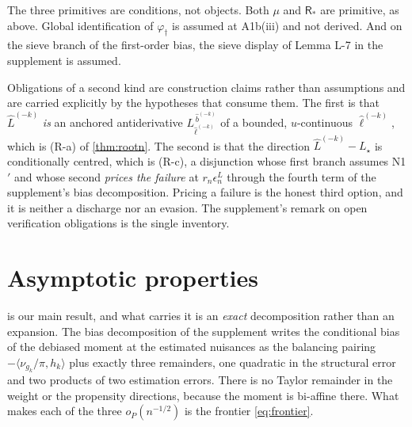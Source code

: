 \documentclass[
  12pt]{article}
\newcommand{\1}[1]{\mathds{1}\left[#1\right]}
\theoremstyle{plain}
\theoremstyle{definition}
\theoremstyle{definition}
\theoremstyle{remark}
\newcommand{\vdagger}{\varphi_{\dagger}}
\begin{document}
The three primitives are conditions, not objects. Both \(\mu\) and
\(\mathsf R_\ast\) are primitive, as above. Global identification of
\(\vdagger\) is assumed at A1b(iii) and not derived. And on the sieve
branch of the first-order bias, the sieve display of Lemma L-7 in the
supplement is assumed.

Obligations of a second kind are construction claims rather than
assumptions and are carried explicitly by the hypotheses that consume
them. The first is that \(\hat L^{(-k)}\) \emph{is} an anchored
antiderivative \(L^{\,\hat b^{(-k)}}_{\hat\ell^{(-k)}}\) of a bounded,
\(u\)-continuous \(\hat\ell^{(-k)}\), which is (R-a) of
\cref{thm:rootn}. The second is that the direction
\(\hat L^{(-k)}-L_\star\) is conditionally centred, which is (R-c), a
disjunction whose first branch assumes N1\('\) and whose second
\emph{prices the failure} at \(r_n\epsilon^{L}_n\) through the fourth
term of the supplement's bias decomposition. Pricing a failure is the
honest third option, and it is neither a discharge nor an evasion. The
supplement's remark on open verification obligations is the single
inventory.



\section{Asymptotic properties}\label{asymptotic-properties}



 is our main result, and what carries it is an
\emph{exact} decomposition rather than an expansion. The bias
decomposition of the supplement writes the conditional bias of the
debiased moment at the estimated nuisances as the balancing pairing
\(-\langle\nu_{g_k}/\pi,h_k\rangle\) plus exactly three remainders, one
quadratic in the structural error and two products of two estimation
errors. There is no Taylor remainder in the weight or the propensity
directions, because the moment is bi-affine there. What makes each of
the three \(o_P(n^{-1/2})\) is the frontier \eqref{eq:frontier}.
\end{document}
